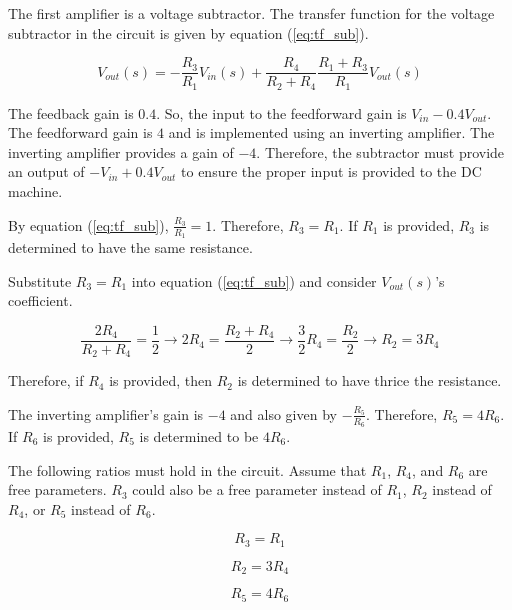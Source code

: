 The first amplifier is a voltage subtractor.
The transfer function for the voltage subtractor in the circuit is given by equation (\ref{eq:tf_sub}).

\begin{equation}
	\label{eq:tf_sub}
	V_{out}(s) = -\frac{ R_3 }{ R_1 }V_{in}(s) + \frac{ R_4 }{ R_2 + R_4 } \frac{ R_1 + R_3 }{ R_1 } V_{out}(s)
\end{equation}

The feedback gain is $0.4$.
So, the input to the feedforward gain is $V_{in} - 0.4V_{out}$.
The feedforward gain is $4$ and is implemented using an inverting amplifier.
The inverting amplifier provides a gain of $-4$.
Therefore, the subtractor must provide an output of $-V_{in} + 0.4V_{out}$ to ensure the proper input is provided to the DC machine.

By equation (\ref{eq:tf_sub}), $\frac{R_3}{R_1} = 1$.
Therefore, $R_3 = R_1$.
If $R_1$ is provided, $R_3$ is determined to have the same resistance.

Substitute $R_3 = R_1$ into equation (\ref{eq:tf_sub}) and consider $V_{out}(s)$'s coefficient.

\begin{equation}
	\label{eq:solve_for_r2r4}
	\frac{2 R_4}{R_2 + R_4} = \frac{1}{2}
	\rightarrow 2 R_4 = \frac{R_2 + R_4}{2}
	\rightarrow \frac{3}{2} R_4 = \frac{R_2}{2}
	\rightarrow R_2 = 3 R_4
\end{equation}

Therefore, if $R_4$ is provided, then $R_2$ is determined to have thrice the resistance.

The inverting amplifier's gain is $-4$ and also given by $-\frac{R_5}{R_6}$.
Therefore, $R_5 = 4 R_6$.
If $R_6$ is provided, $R_5$ is determined to be $4 R_6$.

The following ratios must hold in the circuit.
Assume that $R_1$, $R_4$, and $R_6$ are free parameters.
$R_3$ could also be a free parameter instead of $R_1$, $R_2$ instead of $R_4$, or $R_5$ instead of $R_6$.

\begin{equation}
	\label{eq:final_r3_r1}
	R_3 = R_1
\end{equation}

\begin{equation}
	\label{eq:final_r2_r4}
	R_2 = 3 R_4
\end{equation}

\begin{equation}
	\label{eq:final_r5_r6}
	R_5 = 4 R_6
\end{equation}
